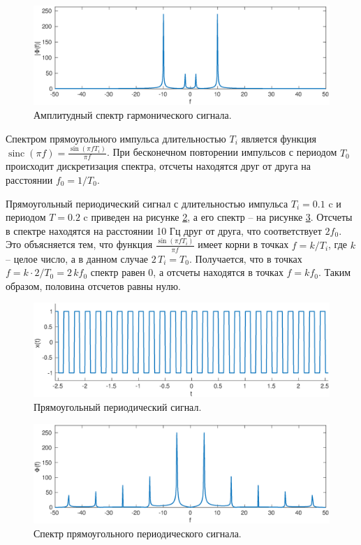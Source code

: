 \documentclass[a4paper,14pt]{extarticle}
\DeclareMathOperator{\sinc}{sinc}
\begin{document}
\begin{figure}[H]
\includegraphics[width=1\textwidth]{sin_s.eps}
\caption{Амплитудный спектр гармонического сигнала.}
\label{sin_s}
\end{figure}

Спектром прямоугольного импульса длительностью $T_i$ является функция $\sinc(\pi f)=\frac{\sin(\pi f T_i)}{\pi f}$. При бесконечном повторении импульсов с периодом $T_0$ происходит дискретизация спектра, отсчеты находятся друг от друга на расстоянии $f_0 = 1/T_0$. 

Прямоугольный периодический сигнал с длительностью импульса $T_i = 0.1$ c и периодом $T = 0.2$ c приведен на рисунке \ref{sqr_x}, а его спектр -- на рисунке \ref{sqr_s}. Отсчеты в спектре находятся на расстоянии 10 Гц друг от друга, что соответствует $2f_0$. Это объясняется тем, что функция $\frac{\sin(\pi f T_i)}{\pi f}$ имеет корни в точках $f = k/T_i$, где $k$ -- целое число, а в данном случае $2\,T_i = T_0$. Получается, что в точках $f = k \cdot 2/T_0 =  2 \, k f_0$ спектр равен 0, а отсчеты находятся в точках $f = k f_0$. Таким образом, половина отсчетов равны нулю.

\begin{figure}[H]
\includegraphics[width=1\textwidth]{sqr_x.eps}
\caption{Прямоугольный периодический сигнал.}
\label{sqr_x}
\end{figure}

\begin{figure}[H]
\includegraphics[width=1\textwidth]{sqr_s.eps}
\caption{Спектр прямоугольного периодического сигнала. }
\label{sqr_s}
\end{figure}
\end{document}

